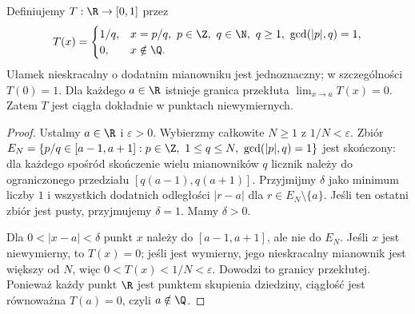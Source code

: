 \begin{przyklad}
\label{ma1:ex:thomae}
Definiujemy $T:\R\to[0,1]$ przez
\[
 T(x)=
 \begin{cases}
 1/q,& x=p/q,\ p\in\Z,\ q\in\N,\ q\ge1,\ \gcd(|p|,q)=1,\\
 0,&x\notin\Q.
 \end{cases}
\]
Ułamek nieskracalny o dodatnim mianowniku jest jednoznaczny; w szczególności $T(0)=1$. Dla każdego $a\in\R$ istnieje granica przekłuta $\lim_{x\to a}T(x)=0$. Zatem $T$ jest ciągła dokładnie w punktach niewymiernych.
\end{przyklad}
\begin{proof}
Ustalmy $a\in\R$ i $\varepsilon>0$. Wybierzmy całkowite $N\ge1$ z $1/N<\varepsilon$. Zbiór
$E_N=\{p/q\in[a-1,a+1]:p\in\Z,\ 1\le q\le N,\ \gcd(|p|,q)=1\}$
jest skończony: dla każdego spośród skończenie wielu mianowników $q$ licznik należy do ograniczonego przedziału $[q(a-1),q(a+1)]$. Przyjmijmy $\delta$ jako minimum liczby $1$ i wszystkich dodatnich odległości $|r-a|$ dla $r\in E_N\setminus\{a\}$. Jeśli ten ostatni zbiór jest pusty, przyjmujemy $\delta=1$. Mamy $\delta>0$.

Dla $0<|x-a|<\delta$ punkt $x$ należy do $[a-1,a+1]$, ale nie do $E_N$. Jeśli $x$ jest niewymierny, to $T(x)=0$; jeśli jest wymierny, jego nieskracalny mianownik jest większy od $N$, więc $0<T(x)<1/N<\varepsilon$. Dowodzi to granicy przekłutej. Ponieważ każdy punkt $\R$ jest punktem skupienia dziedziny, ciągłość jest równoważna $T(a)=0$, czyli $a\notin\Q$.
\end{proof}
